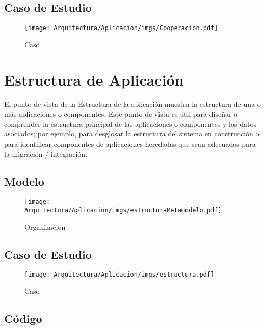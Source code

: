 \subsection{Caso de Estudio}

\begin{figure}[h!]
	\centering
	\texttt{[image: Arquitectura/Aplicacion/imgs/Cooperacion.pdf]}
	\caption{Caso}
\end{figure}

\newpage

\section{Estructura de Aplicación}
El punto de vista de la Estructura de la aplicación muestra la estructura de una o más aplicaciones o componentes. Este punto de vista es útil para diseñar o comprender la estructura principal de las aplicaciones o componentes y los datos asociados; por ejemplo, para desglosar la estructura del sistema en construcción o para identificar componentes de aplicaciones heredadas que sean adecuados para la migración / integración.
\subsection{Modelo}
\begin{figure}[h!]
	\centering
	\texttt{[image: Arquitectura/Aplicacion/imgs/estructuraMetamodelo.pdf]}
	\caption{Organización}
\end{figure}
\newpage
\subsection{Caso de Estudio}

\begin{figure}[h!]
	\centering
	\texttt{[image: Arquitectura/Aplicacion/imgs/estructura.pdf]}
	\caption{Caso}
\end{figure}


\subsection{Código}









\newpage

